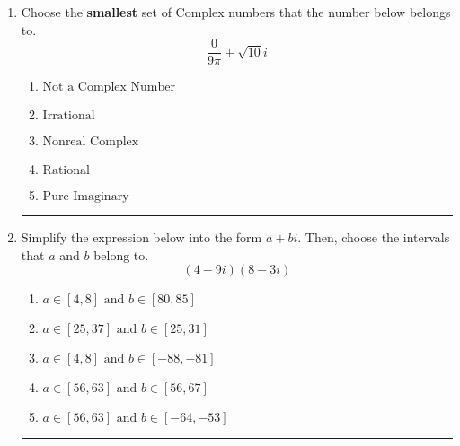 \documentclass[14pt]{extbook}
\newcommand{\litem}[1]{\item#1\hspace*{-1cm}\rule{\textwidth}{0.4pt}}
\begin{document}
\begin{enumerate}
{\begin{enumerate}[label=\Alph*.]
\end{enumerate} }
\litem{
Choose the \textbf{smallest} set of Complex numbers that the number below belongs to.\[ \frac{0}{9 \pi}+\sqrt{10}i \]\begin{enumerate}[label=\Alph*.]
\item \( \text{Not a Complex Number} \)
\item \( \text{Irrational} \)
\item \( \text{Nonreal Complex} \)
\item \( \text{Rational} \)
\item \( \text{Pure Imaginary} \)

\end{enumerate} }
\litem{
Simplify the expression below into the form $a+bi$. Then, choose the intervals that $a$ and $b$ belong to.\[ (4 - 9 i)(8 - 3 i) \]\begin{enumerate}[label=\Alph*.]
\item \( a \in [4, 8] \text{ and } b \in [80, 85] \)
\item \( a \in [25, 37] \text{ and } b \in [25, 31] \)
\item \( a \in [4, 8] \text{ and } b \in [-88, -81] \)
\item \( a \in [56, 63] \text{ and } b \in [56, 67] \)
\item \( a \in [56, 63] \text{ and } b \in [-64, -53] \)

\end{enumerate} }
\end{enumerate}
\end{document}
